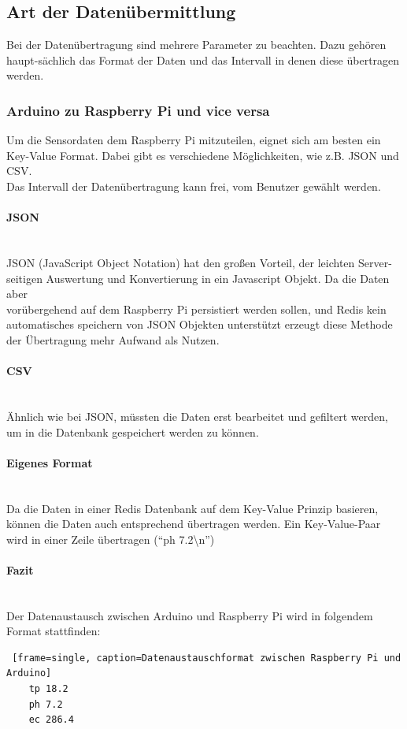 \newpage

\subsection{Art der Daten\"ubermittlung}
Bei der Daten\"ubertragung sind mehrere Parameter zu beachten. Dazu geh\"oren haupt-s\"achlich das Format der Daten und das Intervall in denen diese \"ubertragen werden.
\subsubsection{Arduino zu Raspberry Pi und vice versa}
Um die Sensordaten dem Raspberry Pi mitzuteilen, eignet sich am besten ein Key-Value Format. Dabei gibt es verschiedene M\"oglichkeiten, wie z.B. \gls{JSON} und \gls{CSV}. \\
Das Intervall der Daten\"ubertragung kann frei, vom Benutzer gew\"ahlt werden.
\paragraph{\gls{JSON}} \mbox{}\\
\gls{JSON} (JavaScript Object Notation) hat den gro{\ss}en Vorteil, der leichten Server-seitigen Auswertung und Konvertierung in ein Javascript Objekt. Da die Daten aber \\ vorübergehend auf dem Raspberry Pi persistiert werden sollen, und Redis kein automatisches speichern von \gls{JSON} Objekten unterst\"utzt erzeugt diese Methode der \"Ubertragung mehr Aufwand als Nutzen.
\paragraph{\gls{CSV}} \mbox{}\\
\"Ahnlich wie bei \gls{JSON}, m\"ussten die Daten erst bearbeitet und gefiltert werden, um in die Datenbank gespeichert werden zu k\"onnen.
\paragraph{Eigenes Format} \mbox{}\\
Da die Daten in einer Redis Datenbank auf dem Key-Value Prinzip basieren, können die Daten auch entsprechend übertragen werden. Ein Key-Value-Paar wird in einer Zeile übertragen ("`ph 7.2\textbackslash n"')
\paragraph{Fazit} \mbox{}\\
Der Datenaustausch zwischen Arduino und Raspberry Pi wird in folgendem Format stattfinden:
\begin{lstlisting} [frame=single, caption=Datenaustauschformat zwischen Raspberry Pi und Arduino]
	tp 18.2
	ph 7.2
	ec 286.4
\end{lstlisting}

